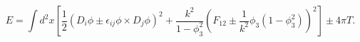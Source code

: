 \begin{equation} \label{energy} E=\int
d^2x\left[ \frac{1}{2}(D_i\phi\pm \epsilon_{ij}\phi\times D_j\phi
)^2+\frac{k^2}{1-\phi_3^2}\left( F_{12}\pm
\frac{1}{k^2}\phi_3(1-\phi_3^2)\right)^2\right] \pm 4\pi T.
\end{equation}

